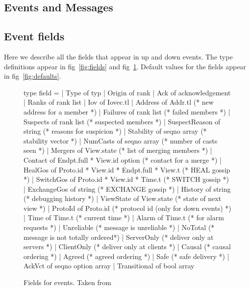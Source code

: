 \begin{EventType}




\end{EventType}

\subsection{Events and Messages}

\subsection{Event fields}
Here we describe all the fields that appear in up and down events.  The
type definitions appear in fig~\ref{fig:fields} and
fig~\ref{fig:extensions}.  Default values for the fields appear in
fig~\ref{fig:defaults}.

\begin{figure}
\begin{codebox}

type field =
  | Type	of typ
  | Origin	of rank
  | Ack	        of acknowledgement
  | Ranks       of rank list
  | Iov	        of Iovec.tl
  | Address     of Addr.tl		(* new address for a member *)
  | Failures	of rank list		(* failed members *)
  | Suspects	of rank list            (* suspected members *)
  | SuspectReason of string		(* reasons for suspicion *)
  | Stability	of seqno array		(* stability vector *)
  | NumCasts	of seqno array		(* number of casts seen *)
  | Mergers	of View.state		(* list of merging members *)
  | Contact	of Endpt.full * View.id option (* contact for a merge *)
  | HealGos	of Proto.id * View.id * Endpt.full * View.t (* HEAL gossip *)
  | SwitchGos	of Proto.id * View.id * Time.t  (* SWITCH gossip *)
  | ExchangeGos	of string		(* EXCHANGE gossip *)
  | History	of string		(* debugging history *)
  | ViewState	of View.state		(* state of next view *)
  | ProtoId	of Proto.id		(* protocol id (only for down events) *)
  | Time        of Time.t		(* current time *)
  | Alarm       of Time.t		(* for alarm requests *)
  | Unreliable				(* message is unreliable *)
  | NoTotal				(* message is not totally ordered*)
  | ServerOnly				(* deliver only at servers *)
  | ClientOnly				(* deliver only at clients *)
  | Causal				(* causal ordering *)
  | Agreed				(* agreed ordering *)
  | Safe				(* safe delivery *)
  | AckVct        of seqno option array
  | Transitional  of bool array
\end{codebox}
\caption{Fields for events.  Taken from }
\label{fig:extensions}
\end{figure}

